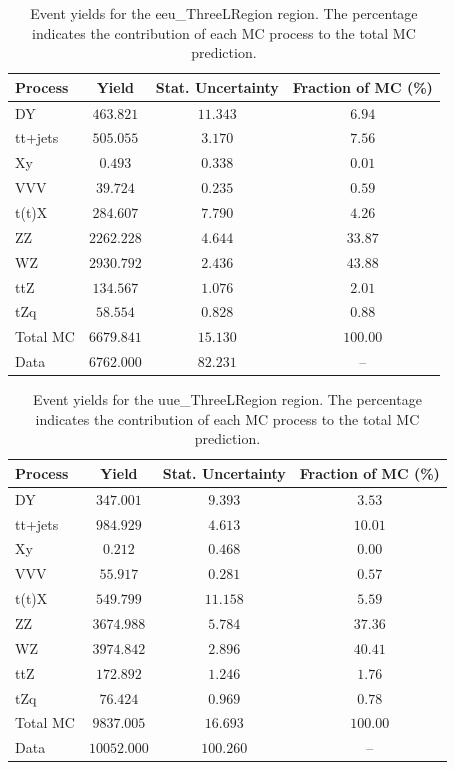 \begin{table}[htbp]
\centering
\caption{Event yields for the eeu\_ThreeLRegion region. The percentage indicates the contribution of each MC process to the total MC prediction.}
\label{tab:eeu_ThreeLRegion_yields}
\begin{tabular}{lccc}
\hline
Process & Yield & Stat. Uncertainty & Fraction of MC (\%) \\
\hline
DY & $463.821$ & $11.343$ & $6.94$ \\
tt+jets & $505.055$ & $3.170$ & $7.56$ \\
Xy & $0.493$ & $0.338$ & $0.01$ \\
VVV & $39.724$ & $0.235$ & $0.59$ \\
t(t)X & $284.607$ & $7.790$ & $4.26$ \\
ZZ & $2262.228$ & $4.644$ & $33.87$ \\
WZ & $2930.792$ & $2.436$ & $43.88$ \\
ttZ & $134.567$ & $1.076$ & $2.01$ \\
tZq & $58.554$ & $0.828$ & $0.88$ \\
\hline
Total MC & $6679.841$ & $15.130$ & $100.00$ \\
Data & $6762.000$ & $82.231$ & -- \\
\hline
\end{tabular}
\end{table}

\begin{table}[htbp]
\centering
\caption{Event yields for the uue\_ThreeLRegion region. The percentage indicates the contribution of each MC process to the total MC prediction.}
\label{tab:uue_ThreeLRegion_yields}
\begin{tabular}{lccc}
\hline
Process & Yield & Stat. Uncertainty & Fraction of MC (\%) \\
\hline
DY & $347.001$ & $9.393$ & $3.53$ \\
tt+jets & $984.929$ & $4.613$ & $10.01$ \\
Xy & $0.212$ & $0.468$ & $0.00$ \\
VVV & $55.917$ & $0.281$ & $0.57$ \\
t(t)X & $549.799$ & $11.158$ & $5.59$ \\
ZZ & $3674.988$ & $5.784$ & $37.36$ \\
WZ & $3974.842$ & $2.896$ & $40.41$ \\
ttZ & $172.892$ & $1.246$ & $1.76$ \\
tZq & $76.424$ & $0.969$ & $0.78$ \\
\hline
Total MC & $9837.005$ & $16.693$ & $100.00$ \\
Data & $10052.000$ & $100.260$ & -- \\
\hline
\end{tabular}
\end{table}

